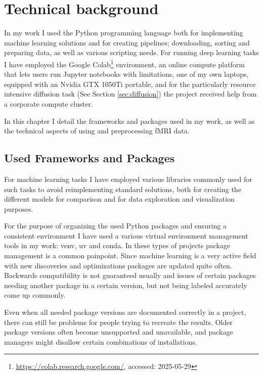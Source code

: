 \chapter{Technical background}

	In my work I used the Python programming language both for implementing machine learning solutions and for creating pipelines; downloading, sorting and preparing data, as well as various scripting needs. For running deep learning tasks I have employed the Google Colab\footnote{\url{https://colab.research.google.com/}, accessed: 2025-05-29} environment, an online compute platform that lets users run Jupyter notebooks with limitations, one of my own laptops, equipped with an Nvidia GTX 1050Ti portable, and for the particularly resource intensive diffusion task (See Section \ref{sec:diffusion}) the project received help from a corporate compute cluster.
	
	In this chapter I detail the frameworks and packages used in my work, as well as the technical aspects of using and preprocessing fMRI data. 

\section{Used Frameworks and Packages}

	For machine learning tasks I have employed various libraries commonly used for such tasks to avoid reimplementing standard solutions, both for creating the different models for comparison and for data exploration and visualization purposes.
	
	For the purpose of organizing the used Python packages and ensuring a consistent environment I have used a various virtual environment management tools in my work: venv, uv and conda. In these types of projects package management is a common painpoint. Since machine learning is a very active field with new discoveries and optimizations packages are updated quite often. Backwards compatibility is not guaranteed usually and issues of certain packages needing another package in a certain version, but not being labeled accurately come up commonly.
	
	Even when all needed package versions are documented correctly in a project, there can still be problems for people trying to recreate the results. Older package versions often become unsupported and unavailable, and package managers might disallow certain combinations of installations.

